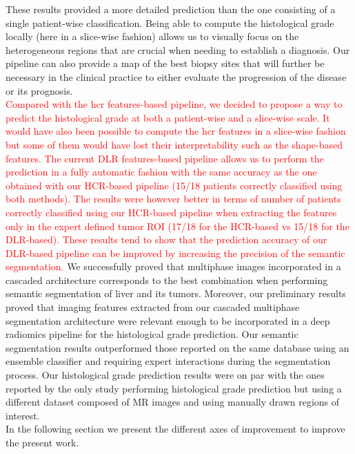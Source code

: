 These results provided a more detailed prediction than the one
consisting of a single patient-wise classification. Being able to
compute the histological grade locally (here in a slice-wise fashion)
allows us to visually focus on the heterogeneous regions that are
crucial when needing to establish a diagnosis. Our pipeline can also
provide a map of the best biopsy sites that will further be necessary in
the clinical practice to either evaluate the progression of the disease
or its prognosis.\\
\textcolor{red}
{
Compared with the \ac{hcr} features-based pipeline, we decided to propose a way to predict the histological grade at both a patient-wise and a slice-wise scale. It would have also been possible to compute the \ac{hcr} features in a slice-wise fashion but some of them would have lost their interpretability such as the shape-based features. The current DLR features-based pipeline allows us to perform the prediction in a fully automatic fashion with the same accuracy as the one obtained with our HCR-based pipeline (15/18 patients correctly classified using both methods). The results were however better in terms of number of patients correctly classified using our HCR-based pipeline when extracting the features only in the expert defined tumor ROI (17/18 for the HCR-based vs 15/18 for the DLR-based). These results tend to show that the prediction accuracy of our DLR-based pipeline can be improved by increasing the precision of the semantic segmentation.
}
We successfully proved that multiphase images incorporated in a cascaded architecture corresponds to the best combination when performing semantic segmentation of liver and its tumors. Moreover, our preliminary results proved that imaging features extracted from our cascaded multiphase segmentation architecture were relevant enough to be incorporated in a deep radiomics pipeline for the histological grade prediction. 
Our semantic segmentation results outperformed those reported on the same database using an ensemble classifier and requiring expert interactions during the segmentation process.
Our histological grade prediction results were on par with the ones reported by the only study performing histological grade prediction but using a different dataset composed of MR images and using manually drawn regions of interest.\\
In the following section we present the different axes of improvement to improve the present work.

